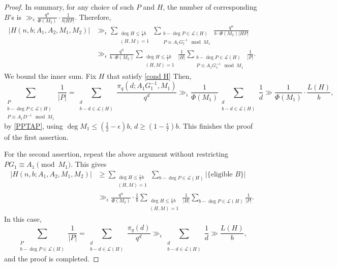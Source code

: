 \documentclass[12pt]{amsart}
\numberwithin{equation}{section}
\theoremstyle{definition}
\theoremstyle{remark}
\begin{document}
\begin{proof}
    In summary, for any choice of such $P$ and $H$, the number of corresponding $B$'s is $\gg_{\epsilon} \frac{q^n}{\Phi(M_2)} \cdot \frac{1}{b|HP|}$.
    Therefore,
    \begin{align*}
        |H(n,b; A_1,A_2,M_1,M_2)| &\gg_{\epsilon} \sum_{\substack{\deg H \leq \frac{\epsilon}{7}b \\ (H,M)=1}} \sum_{\substack{b-\deg P \in \mathcal{L}(H) \\ P \equiv A_1G_1^{-1} \mod M_1}} \frac{q^n}{b \cdot \Phi(M_2)|HP|}  \\
        &\gg_{\epsilon} \frac{q^n}{b \cdot\Phi(M_2)} \sum_{\substack{\deg H \leq \frac{\epsilon}{7}b \\ (H,M)=1}} \frac{1}{|H|} \sum_{\substack{b-\deg P\in \mathcal{L}(H) \\ P \equiv A_1G_1^{-1} \mod M_1}} \frac{1}{|P|}.
    \end{align*}
    We bound the inner sum. Fix $H$ that satisfy \ref{cond H}
    Then,
    \[
        \sum_{\substack{P \\ b- \deg P \in\mathcal{L}(H) \\ P \equiv A_1D^{-1} \mod M_1}} \frac{1}{|P|} = \sum_{\substack{d \\ b-d\in\mathcal{L}(H)}} \frac{\pi_q(d; A_1G_1^{-1}, M_1)}{q^d} \gg_{\epsilon}
        \frac{1}{\Phi(M_1)} \sum_{\substack{d \\ b-d\in\mathcal{L}(H)}} \frac{1}{d} \gg \frac{1}{\Phi(M_1)} \cdot \frac{L(H)}{b},
    \]
    by \eqref{PPTAP}, using $\deg M_1 \leq  (\frac{1}{2} - \epsilon) b$, $d \geq (1-\frac{\epsilon}{7})b$. This finishes the proof of the first assertion.
    
    For the second assertion, repeat the above argument without restricting $PG_1\equiv A_1 \pmod{M_1}$. This gives
    \begin{align*}
        |H(n,b; A_1,A_2,M_1,M_2)| &\geq \sum_{\substack{\deg H \leq \frac{\epsilon}{7}b \\ (H,M)=1}} \sum_{b-\deg P \in \mathcal{L}(H)} |\{ \mbox{eligible $B$}\}|  \\
        &\gg_{\epsilon} \frac{q^n}{\Phi(M_2)} \cdot \frac{1}{b} \sum_{\substack{\deg H \leq \frac{\epsilon}{7}b \\ (H,M)=1}} \frac{1}{|H|} \sum_{b-\deg P\in \mathcal{L}(H) } \frac{1}{|P|}.
    \end{align*}
    In this case,
    \[
        \sum_{\substack{P \\ b- \deg P\in\mathcal{L}(H)}} \frac{1}{|P|} = \sum_{\substack{d \\ b-d\in\mathcal{L}(H)}} \frac{\pi_q(d)}{q^d} \gg_{\epsilon}
         \sum_{\substack{d \\ b-d\in\mathcal{L}(H)}} \frac{1}{d} \gg\frac{L(H)}{b},
    \]
    and the proof is completed.
\end{proof}
\end{document}

